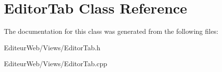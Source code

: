 \hypertarget{class_editor_tab}{
\section{EditorTab Class Reference}
\label{class_editor_tab}
}


The documentation for this class was generated from the following files:\begin{DoxyCompactItemize}
\item 
EditeurWeb/Views/EditorTab.h\item 
EditeurWeb/Views/EditorTab.cpp\end{DoxyCompactItemize}
